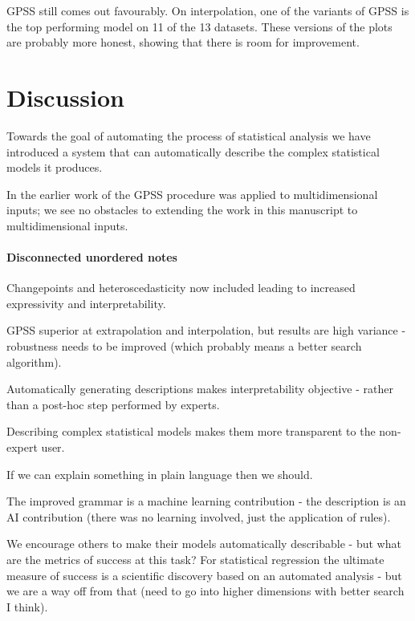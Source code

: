 \documentclass{article}
\begin{document}
GPSS still comes out favourably.
On interpolation, one of the variants of GPSS is the top performing model on 11 of the 13 datasets.
These versions of the plots are probably more honest, showing that there is room for improvement.











\section{Discussion}


Towards the goal of automating the process of statistical analysis we have introduced a system that can automatically describe the complex statistical models it produces.

In the earlier work of \cite{DuvLloGroetal13} the GPSS procedure was applied to multidimensional inputs; we see no obstacles to extending the work in this manuscript to multidimensional inputs.

\paragraph{Disconnected unordered notes}

Changepoints and heteroscedasticity now included leading to increased expressivity and interpretability.

GPSS superior at extrapolation and interpolation, but results are high variance - robustness needs to be improved (which probably means a better search algorithm).

Automatically generating descriptions makes interpretability objective - rather than a post-hoc step performed by experts.

Describing complex statistical models makes them more transparent to the non-expert user.

If we can explain something in plain language then we should.

The improved grammar is a machine learning contribution - the description is an AI contribution (there was no learning involved, just the application of rules).

We encourage others to make their models automatically describable - but what are the metrics of success at this task?
For statistical regression the ultimate measure of success is a scientific discovery based on an automated analysis - but we are a way off from that (need to go into higher dimensions with better search I think).
\end{document}
